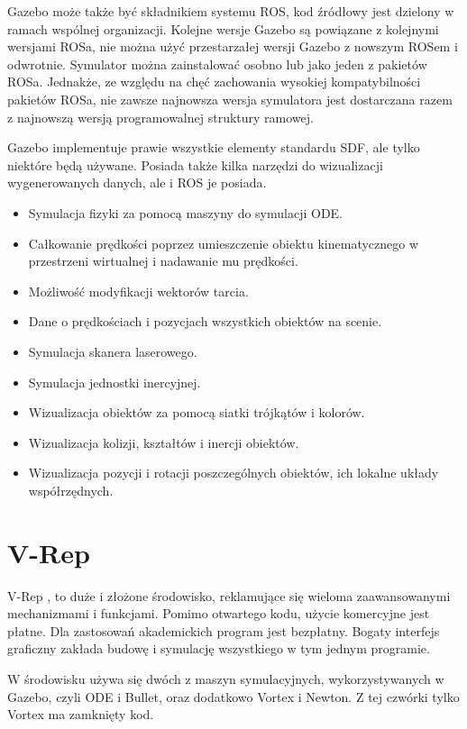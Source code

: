 	Gazebo może także być składnikiem systemu ROS, kod źródłowy jest dzielony w ramach wspólnej organizacji.
	Kolejne wersje Gazebo są powiązane z kolejnymi wersjami ROSa, nie można użyć przestarzałej wersji Gazebo z nowszym ROSem i odwrotnie.
	Symulator można zainstalować osobno lub jako jeden z pakietów ROSa.
	Jednakże, ze względu na chęć zachowania wysokiej kompatybilności pakietów ROSa, nie zawsze najnowsza wersja symulatora jest dostarczana razem z najnowszą wersją programowalnej struktury ramowej.
	
	Gazebo implementuje prawie wszystkie elementy standardu SDF, ale tylko niektóre będą używane. Posiada także kilka narzędzi do wizualizacji wygenerowanych danych, ale i ROS je posiada.
	\begin{itemize}
		\item Symulacja fizyki za pomocą maszyny do symulacji ODE.
		\item Całkowanie prędkości poprzez umieszczenie obiektu kinematycznego w przestrzeni wirtualnej i nadawanie mu prędkości.
		\item Możliwość modyfikacji wektorów tarcia.
		\item Dane o prędkościach i pozycjach wszystkich obiektów na scenie.
		\item Symulacja skanera laserowego.
		\item Symulacja jednostki inercyjnej.
		\item Wizualizacja obiektów za pomocą siatki trójkątów i kolorów.
		\item Wizualizacja kolizji, kształtów i inercji obiektów.
		\item Wizualizacja pozycji i rotacji poszczególnych obiektów, ich lokalne układy współrzędnych.
	\end{itemize}

\section{V-Rep}
	V-Rep \cite{vrep_website}, to duże i złożone środowisko, reklamujące się wieloma zaawansowanymi mechanizmami i funkcjami.
	Pomimo otwartego kodu, użycie komercyjne jest płatne. Dla zastosowań akademickich program jest bezpłatny.
	Bogaty interfejs graficzny zakłada budowę i symulację wszystkiego w tym jednym programie.

	W środowisku używa się dwóch z maszyn symulacyjnych, wykorzystywanych w Gazebo, czyli ODE i Bullet, oraz dodatkowo Vortex i Newton. Z tej czwórki tylko Vortex ma zamknięty kod.


